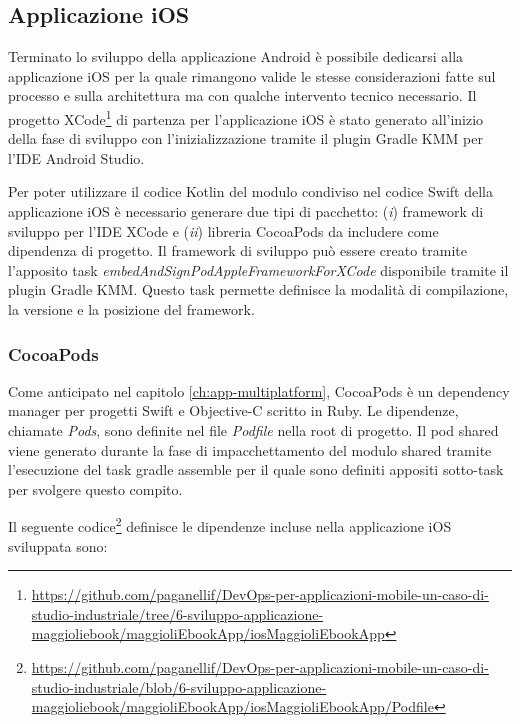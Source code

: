 \subsection{Applicazione iOS}
Terminato lo sviluppo della applicazione Android è possibile dedicarsi alla applicazione iOS per la quale rimangono valide le stesse considerazioni fatte sul processo e sulla architettura ma con qualche intervento tecnico necessario. Il progetto XCode\footnote{\href{https://github.com/paganellif/DevOps-per-applicazioni-mobile-un-caso-di-studio-industriale/tree/6-sviluppo-applicazione-maggioliebook/maggioliEbookApp/iosMaggioliEbookApp}{https://github.com/paganellif/DevOps-per-applicazioni-mobile-un-caso-di-studio-industriale/tree/6-sviluppo-applicazione-maggioliebook/maggioliEbookApp/iosMaggioliEbookApp}} di partenza per l'applicazione iOS è stato generato all'inizio della fase di sviluppo con l'inizializzazione tramite il plugin Gradle KMM per l'IDE Android Studio.

Per poter utilizzare il codice Kotlin del modulo condiviso nel codice Swift della applicazione iOS è necessario generare due tipi di pacchetto: (\textit{i}) framework di sviluppo per l'IDE XCode e (\textit{ii}) libreria CocoaPods da includere come dipendenza di progetto. Il framework di sviluppo può essere creato tramite l'apposito task \textit{embedAndSignPodAppleFrameworkForXCode} disponibile tramite il plugin Gradle KMM. Questo task permette definisce la modalità di compilazione, la versione e la posizione del framework.

\subsubsection*{CocoaPods}
Come anticipato nel capitolo \ref{ch:app-multiplatform}, CocoaPods è un dependency manager per progetti Swift e Objective-C scritto in Ruby. Le dipendenze, chiamate \textit{Pods}, sono definite nel file \textit{Podfile} nella root di progetto. Il pod shared viene generato durante la fase di impacchettamento del modulo shared tramite l’esecuzione del task gradle assemble per il quale sono definiti appositi sotto-task per svolgere questo compito.

Il seguente codice\footnote{\href{https://github.com/paganellif/DevOps-per-applicazioni-mobile-un-caso-di-studio-industriale/blob/6-sviluppo-applicazione-maggioliebook/maggioliEbookApp/iosMaggioliEbookApp/Podfile}{https://github.com/paganellif/DevOps-per-applicazioni-mobile-un-caso-di-studio-industriale/blob/6-sviluppo-applicazione-maggioliebook/maggioliEbookApp/iosMaggioliEbookApp/Podfile}} definisce le dipendenze incluse nella applicazione iOS sviluppata sono:

